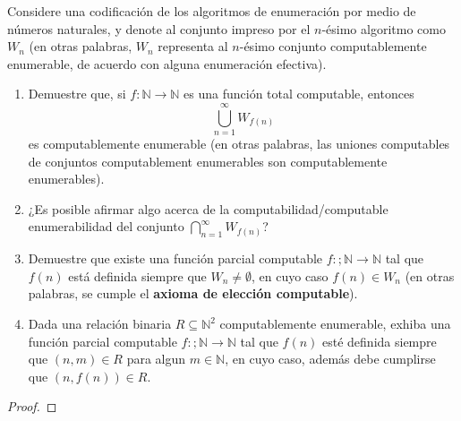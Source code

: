 \documentclass[12pt]{report}
\newcounter{it}
\theoremstyle{largebreak}
\newcommand\cf[3]{\ensuremath{#1:#2\rightarrow#3}}
\begin{document}
    \begin{excer}
        Considere una codificación de los algoritmos de enumeración por medio de números naturales, y denote al conjunto impreso por el $n$-ésimo algoritmo como $W_n$ (en otras palabras, $W_n$ representa al $n$-ésimo conjunto computablemente enumerable, de acuerdo con alguna enumeración efectiva).
        \begin{enumerate}[label = \textit{(\alph*)}]
            \item Demuestre que, si $\cf{f}{\mathbb{N}}{\mathbb{N}}$ es una función total computable, entonces
            \begin{equation*}
                \bigcup_{ n=1}^\infty W_{f(n)}
            \end{equation*}
            es computablemente enumerable (en otras palabras, las uniones computables de conjuntos computablement enumerables son computablemente enumerables).
            \item ¿Es posible afirmar algo acerca de la computabilidad/computable enumerabilidad del conjunto $\bigcap_{ n=1}^\infty W_{f(n)}$?
            \item Demuestre que existe una función parcial computable $\cf{f}{;\mathbb{N}}{\mathbb{N}}$ tal que $f(n)$ está definida siempre que $W_n\neq\emptyset$, en cuyo caso $f(n)\in W_n$ (en otras palabras, se cumple el \textbf{axioma de elección computable}).
            \item Dada una relación binaria $R\subseteq\mathbb{N}^2$ computablemente enumerable, exhiba una función parcial computable $\cf{f}{;\mathbb{N}}{\mathbb{N}}$ tal que $f(n)$ esté definida siempre que $(n,m)\in R$ para algun $m\in\mathbb{N}$, en cuyo caso, además debe cumplirse que $(n,f(n))\in R$.
        \end{enumerate}
    \end{excer}

    \begin{proof}
        
    \end{proof}
\end{document}
